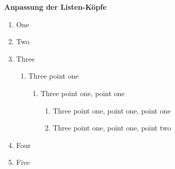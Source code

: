 \documentclass[a5paper]{article}
\begin{document}
\textbf{Anpassung der Listen-Köpfe}

\renewcommand{\labelenumii}{\arabic{enumi}.\arabic{enumii}}
\renewcommand{\labelenumiii}{\arabic{enumi}.\arabic{enumii}.\arabic{enumiii}}
\renewcommand{\labelenumiv}{\arabic{enumi}.\arabic{enumii}.\arabic{enumiii}.\arabic{enumiv}}

\begin{enumerate}
\item One
\item Two
\item Three
\begin{enumerate}
    \item Three point one
    \begin{enumerate}
    \item Three point one, point one
        \begin{enumerate}
        \item Three point one, point one, point one
        \item Three point one, point one, point two
        \end{enumerate}
    \end{enumerate}
\end{enumerate}
\item Four
\item Five
\end{enumerate}
\end{document}
